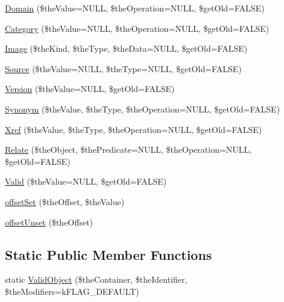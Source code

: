 \begin{DoxyCompactItemize}
\item 
\hyperlink{class_c_ontology_term_a2d89e6f85e9d8596f3c6d013b03755f3}{Domain} (\$the\-Value=N\-U\-L\-L, \$the\-Operation=N\-U\-L\-L, \$get\-Old=F\-A\-L\-S\-E)
\item 
\hyperlink{class_c_ontology_term_adb1c475584372255f01d4fb259acdf77}{Category} (\$the\-Value=N\-U\-L\-L, \$the\-Operation=N\-U\-L\-L, \$get\-Old=F\-A\-L\-S\-E)
\item 
\hyperlink{class_c_ontology_term_aeecc9bfe1e49117ccb6d93cfb3d8bdb0}{Image} (\$the\-Kind, \$the\-Type, \$the\-Data=N\-U\-L\-L, \$get\-Old=F\-A\-L\-S\-E)
\item 
\hyperlink{class_c_ontology_term_ae31144406c264b94ccc4fc1e2cfc8138}{Source} (\$the\-Value=N\-U\-L\-L, \$the\-Type=N\-U\-L\-L, \$get\-Old=F\-A\-L\-S\-E)
\item 
\hyperlink{class_c_ontology_term_a1c7a5924f22758e6487b0b84818a7f3d}{Version} (\$the\-Value=N\-U\-L\-L, \$get\-Old=F\-A\-L\-S\-E)
\item 
\hyperlink{class_c_ontology_term_a26dac200df1d1c49ebc29ccf51b19204}{Synonym} (\$the\-Value, \$the\-Type, \$the\-Operation=N\-U\-L\-L, \$get\-Old=F\-A\-L\-S\-E)
\item 
\hyperlink{class_c_ontology_term_a5a485c448698dbc27f6602d2256a0031}{Xref} (\$the\-Value, \$the\-Type, \$the\-Operation=N\-U\-L\-L, \$get\-Old=F\-A\-L\-S\-E)
\item 
\hyperlink{class_c_ontology_term_a47a361f6634f8e1df8186571a350711e}{Relate} (\$the\-Object, \$the\-Predicate=N\-U\-L\-L, \$the\-Operation=N\-U\-L\-L, \$get\-Old=F\-A\-L\-S\-E)
\item 
\hyperlink{class_c_ontology_term_a926d7b17908b252e584343db52bb9a45}{Valid} (\$the\-Value=N\-U\-L\-L, \$get\-Old=F\-A\-L\-S\-E)
\item 
\hyperlink{class_c_ontology_term_aba486e72f54e61651a75da75215aaa7c}{offset\-Set} (\$the\-Offset, \$the\-Value)
\item 
\hyperlink{class_c_ontology_term_a622c31b9466e49a1413d38fda9ef9bb1}{offset\-Unset} (\$the\-Offset)
\end{DoxyCompactItemize}
\subsection*{Static Public Member Functions}
\begin{DoxyCompactItemize}
\item 
static \hyperlink{class_c_ontology_term_a2372abc77a54330f60447a196db1ee7f}{Valid\-Object} (\$the\-Container, \$the\-Identifier, \$the\-Modifiers=k\-F\-L\-A\-G\-\_\-\-D\-E\-F\-A\-U\-L\-T)
\end{DoxyCompactItemize}
